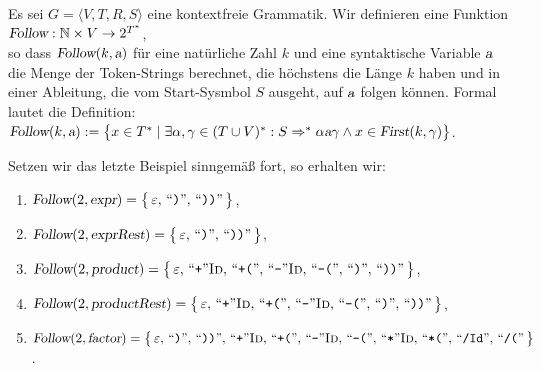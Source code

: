 \begin{Definition}
  Es sei $G = \langle V, T, R, S \rangle$ eine kontextfreie Grammatik. Wir definieren eine Funktion
  \\[0.2cm]
  \hspace*{1.3cm}
  $\textsl{Follow}: \mathbb{N} \times V \rightarrow 2^{T^*}$,
  \\[0.2cm]
  so dass $\textsl{Follow}(k,\textsl{a})$ für eine natürliche Zahl $k$ und eine syntaktische
  Variable $\textsl{a}$ die Menge der Token-Strings berechnet, die
  höchstens die Länge $k$ haben und in einer Ableitung, die vom Start-Sysmbol $S$ ausgeht,
  auf $\textsl{a}$ folgen können.  Formal
  lautet die Definition:
  \\[0.2cm]
  \hspace*{1.3cm}
  $\textsl{Follow}(k, \textsl{a}) := 
  \bigl\{ x \in T^* \mid \exists \alpha, \gamma \in (T\cup V)^*: 
      S \Rightarrow^* \alpha \textsl{a} \gamma \wedge x \in \textsl{First}(k, \gamma) \bigr\}$. \eox
\end{Definition}

\example
Setzen wir das letzte Beispiel sinngemäß fort, so erhalten wir:
\begin{enumerate}
\item $\textsl{Follow}(2, \textsl{expr}) = 
      \bigl\{\, \varepsilon,\, 
      \mbox{``\texttt{)}''},\, 
      \mbox{``\texttt{))}''}\,
      \bigr\}$,
\item $\textsl{Follow}(2, \textsl{exprRest}) = 
      \bigl\{\,
      \varepsilon,\,
      \mbox{``\texttt{)}''},\, 
      \mbox{``\texttt{))}''}\,
      \bigr\}$,
\item $\textsl{Follow}(2, \textsl{product}) = 
      \bigl\{\, 
      \varepsilon,\,
      \mbox{``\texttt{+}''} \textsc{Id},\, 
      \mbox{``\texttt{+(}''},\, 
      \mbox{``\texttt{-}''} \textsc{Id},\,
      \mbox{``\texttt{-(}''},\,
      \mbox{``\texttt{)}''},\, 
      \mbox{``\texttt{))}''}\,
      \bigr\}$,
\item $\textsl{Follow}(2, \textsl{productRest}) = 
      \bigl\{\, 
      \varepsilon,\,
      \mbox{``\texttt{+}''} \textsc{Id},\, 
      \mbox{``\texttt{+(}''},\, 
      \mbox{``\texttt{-}''} \textsc{Id},\,
      \mbox{``\texttt{-(}''},\,
      \mbox{``\texttt{)}''},\, 
      \mbox{``\texttt{))}''}\,
      \bigr\}$,
\item $\textsl{Follow}(2, \textsl{factor}) = \bigl\{\, 
      \varepsilon,\,
      \mbox{``\texttt{)}''},\, 
      \mbox{``\texttt{))}''},\,
      \mbox{``\texttt{+}''} \textsc{Id},\, 
      \mbox{``\texttt{+(}''},\, 
      \mbox{``\texttt{-}''} \textsc{Id},\,
      \mbox{``\texttt{-(}''},\,
      \mbox{``\texttt{*}''} \textsc{Id},\, 
      \mbox{``\texttt{*(}''},\, 
      \mbox{``\texttt{/Id}''},\, 
      \mbox{``\texttt{/(}''}\, 
      \bigr\}$.
\end{enumerate}

